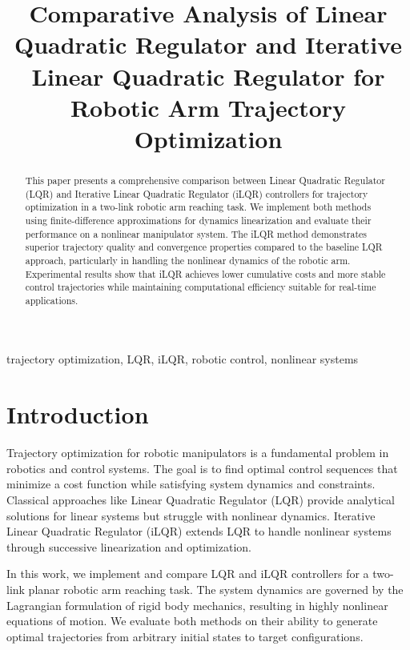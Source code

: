 \documentclass[conference]{IEEEtran}
\begin{document}
\title{Comparative Analysis of Linear Quadratic Regulator and Iterative Linear Quadratic Regulator for Robotic Arm Trajectory Optimization}

\author{
}

\maketitle

\begin{abstract}
This paper presents a comprehensive comparison between Linear Quadratic Regulator (LQR) and Iterative Linear Quadratic Regulator (iLQR) controllers for trajectory optimization in a two-link robotic arm reaching task. We implement both methods using finite-difference approximations for dynamics linearization and evaluate their performance on a nonlinear manipulator system. The iLQR method demonstrates superior trajectory quality and convergence properties compared to the baseline LQR approach, particularly in handling the nonlinear dynamics of the robotic arm. Experimental results show that iLQR achieves lower cumulative costs and more stable control trajectories while maintaining computational efficiency suitable for real-time applications.
\end{abstract}

\begin{IEEEkeywords}
trajectory optimization, LQR, iLQR, robotic control, nonlinear systems
\end{IEEEkeywords}

\section{Introduction}

Trajectory optimization for robotic manipulators is a fundamental problem in robotics and control systems. The goal is to find optimal control sequences that minimize a cost function while satisfying system dynamics and constraints. Classical approaches like Linear Quadratic Regulator (LQR) provide analytical solutions for linear systems but struggle with nonlinear dynamics. Iterative Linear Quadratic Regulator (iLQR) extends LQR to handle nonlinear systems through successive linearization and optimization.

In this work, we implement and compare LQR and iLQR controllers for a two-link planar robotic arm reaching task. The system dynamics are governed by the Lagrangian formulation of rigid body mechanics, resulting in highly nonlinear equations of motion. We evaluate both methods on their ability to generate optimal trajectories from arbitrary initial states to target configurations.
\end{document}
